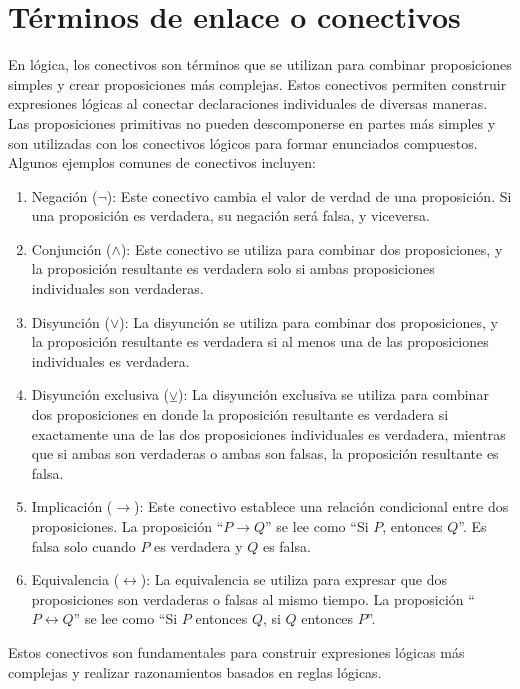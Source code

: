 \section{Términos de enlace o conectivos}

En lógica, los conectivos son términos que se utilizan para combinar proposiciones simples y crear proposiciones más complejas. Estos conectivos permiten construir expresiones lógicas al conectar declaraciones individuales de diversas maneras. Las proposiciones primitivas no pueden descomponerse en partes más simples y son utilizadas con los conectivos lógicos para formar enunciados compuestos. Algunos ejemplos comunes de conectivos incluyen:

\begin{enumerate}
	\item Negación ($\neg$): Este conectivo cambia el valor de verdad de una proposición. Si una proposición es verdadera, su negación será falsa, y viceversa.
	\item Conjunción ($\land$): Este conectivo se utiliza para combinar dos proposiciones, y la proposición resultante es verdadera solo si ambas proposiciones individuales son verdaderas.
	\item Disyunción ($\lor$): La disyunción se utiliza para combinar dos proposiciones, y la proposición resultante es verdadera si al menos una de las proposiciones individuales es verdadera.
    \item Disyunción exclusiva ($\veebar$): La disyunción exclusiva se utiliza para combinar dos proposiciones en donde la proposición resultante es verdadera si exactamente una de las dos proposiciones individuales es verdadera, mientras que si ambas son verdaderas o ambas son falsas, la proposición resultante es falsa.
	\item Implicación ($\rightarrow$): Este conectivo establece una relación condicional entre dos proposiciones. La proposición “$P \rightarrow Q$” se lee como “Si $P$, entonces $Q$”. Es falsa solo cuando $P$ es verdadera y $Q$ es falsa.
	\item Equivalencia ($\leftrightarrow$): La equivalencia se utiliza para expresar que dos proposiciones son verdaderas o falsas al mismo tiempo. La proposición “$P \leftrightarrow Q$” se lee como “Si $P$ entonces $Q$, si $Q$ entonces $P$”.
\end{enumerate}

Estos conectivos son fundamentales para construir expresiones lógicas más complejas y realizar razonamientos basados en reglas lógicas.

